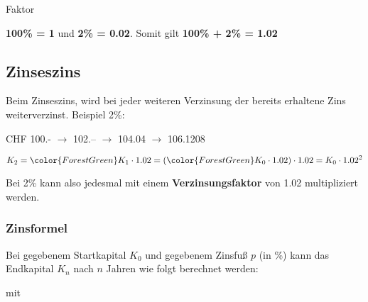 \begin{bemerkung}{Faktor}{}

\textbf{100\% = 1} und  \textbf{2\% = 0.02}. Somit gilt \textbf{100\% + 2\% = 1.02}

\end{bemerkung}
\newpage



\subsection{Zinseszins}



Beim Zinseszins, wird bei jeder weiteren Verzinsung der bereits
erhaltene Zins weiterverzinst. Beispiel 2\%:



CHF 100.- $\rightarrow$ 102.-- $\rightarrow$ 104.04 $\rightarrow$
106.1208

$$K_2 = {\color{ForestGreen}K_1}\cdot{}1.02 = ({\color{ForestGreen}K_0\cdot{}1.02})\cdot{}1.02 = K_0\cdot{}1.02^2$$

Bei 2\% kann also jedesmal mit einem \textbf{Verzinsungsfaktor} von
1.02 multipliziert werden.


\subsubsection{Zinsformel}

Bei gegebenem Startkapital $K_0$ und gegebenem Zinsfuß $p$ (in \%) kann das Endkapital $K_n$ nach $n$ Jahren wie folgt berechnet werden:

\begin{center}\end{center}

mit

